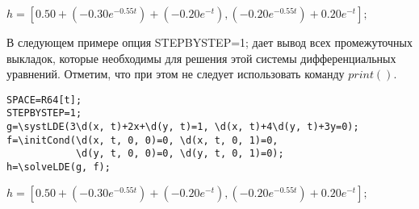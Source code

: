 {$h = [0. 50+(-0. 30 e^{-0. 55t})+(-0. 20 e^{-t}), (-0. 20 e^{-0. 55t})+0. 20 e^{-t}];$}

В следующем примере опция STEPBYSTEP=1; дает вывод всех промежуточных
выкладок, которые необходимы для решения этой системы дифференциальных
уравнений. Отметим, что при этом не следует использовать команду $print()$.

\begin{verbatim}
SPACE=R64[t];
STEPBYSTEP=1;
g=\systLDE(3\d(x, t)+2x+\d(y, t)=1, \d(x, t)+4\d(y, t)+3y=0);
f=\initCond(\d(x, t, 0, 0)=0, \d(x, t, 0, 1)=0, 
            \d(y, t, 0, 0)=0, \d(y, t, 0, 1)=0);
h=\solveLDE(g, f);  
\end{verbatim}

{$h = [0. 50+(-0. 30 e^{-0. 55t})+(-0. 20 e^{-t}), (-0. 20 e^{-0. 55t})+0. 20 e^{-t}];$}

